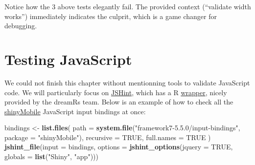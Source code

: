 \documentclass[
]{book}
\newenvironment{Shaded}{\begin{snugshade}}{\end{snugshade}}
\newcommand{\DataTypeTok}[1]{\textcolor[rgb]{0.13,0.29,0.53}{#1}}
\newcommand{\KeywordTok}[1]{\textcolor[rgb]{0.13,0.29,0.53}{\textbf{#1}}}
\newcommand{\NormalTok}[1]{#1}
\newcommand{\OtherTok}[1]{\textcolor[rgb]{0.56,0.35,0.01}{#1}}
\newcommand{\StringTok}[1]{\textcolor[rgb]{0.31,0.60,0.02}{#1}}
\begin{document}
Notice how the 3 above tests elegantly fail. The provided context (``validate width works'') immediately indicates the culprit, which is a game changer for debugging.

\hypertarget{testing-javascript}{%
\section{Testing JavaScript}\label{testing-javascript}}

We could not finish this chapter without mentionning tools to validate JavaScript code. We will particularly focus on \href{https://jshint.com}{JSHint}, which has a R \href{https://github.com/dreamRs/jstools}{wrapper}, nicely provided by the dreamRs team. Below is an example of how to check all the \href{https://github.com/RinteRface/shinyMobile}{shinyMobile} JavaScript input bindings at once:

\begin{Shaded}
\begin{Highlighting}[]
\NormalTok{bindings <-}\StringTok{ }\KeywordTok{list.files}\NormalTok{(}
  \DataTypeTok{path =} \KeywordTok{system.file}\NormalTok{(}\StringTok{"framework7-5.5.0/input-bindings"}\NormalTok{, }\DataTypeTok{package =} \StringTok{"shinyMobile"}\NormalTok{),}
  \DataTypeTok{recursive =} \OtherTok{TRUE}\NormalTok{,}
  \DataTypeTok{full.names =} \OtherTok{TRUE}
\NormalTok{)}
\KeywordTok{jshint_file}\NormalTok{(}\DataTypeTok{input =}\NormalTok{ bindings, }\DataTypeTok{options =} \KeywordTok{jshint_options}\NormalTok{(}\DataTypeTok{jquery =} \OtherTok{TRUE}\NormalTok{, }\DataTypeTok{globals =} \KeywordTok{list}\NormalTok{(}\StringTok{"Shiny"}\NormalTok{, }\StringTok{"app"}\NormalTok{)))}
\end{Highlighting}
\end{Shaded}
\end{document}
